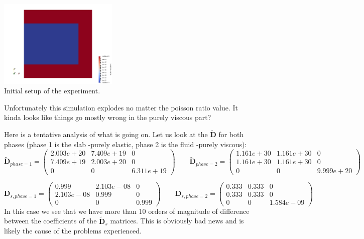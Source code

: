 \begin{center}
\includegraphics[width=5.7cm]{python_codes/fieldstone_129/results/experiment3/K}\\
{\captionfont Initial setup of the experiment.}
\end{center} 

Unfortunately this simulation explodes no matter the poisson ratio value.
It kinda looks like things go mostly wrong in the purely viscous part?

Here is a tentative analysis of what is going on. Let us look at the 
$\tilde{\bm D}$ for both phases (phase 1 is the slab -purely elastic, phase 2 is the fluid -purely viscous):
\[
\tilde{\bm D}_{phase=1} = 
\left(
\begin{array}{ccc}
2.003e+20 &7.409e+19 & 0 \\
7.409e+19  & 2.003e+20 & 0 \\
0 & 0 & 6.311e+19 
\end{array}
\right)
\qquad
\tilde{\bm D}_{phase=2} = 
\left(
\begin{array}{ccc}
1.161e+30 & 1.161e+30 & 0 \\
1.161e+30 & 1.161e+30 & 0 \\
0 & 0 & 9.999e+20
\end{array}
\right)
\]

\[
{\bm D}_{s,phase=1} = 
\left(
\begin{array}{ccc}
0.999    & 2.103e-08 & 0 \\
2.103e-08 & 0.999    & 0 \\
0 & 0 & 0.999
\end{array}
\right)
\qquad
{\bm D}_{s,phase=2} = 
\left(
\begin{array}{ccc}
0.333 & 0.333 & 0 \\ 
0.333 & 0.333 & 0 \\
0 & 0 & 1.584e-09
\end{array}
\right)
\]
In this case we see that we have more than 10 orders of magnitude of 
difference between the coefficients of the $\tilde{\bm D}_s$ matrices.
This is obviously bad news and is likely the cause of the problems
experienced. 

